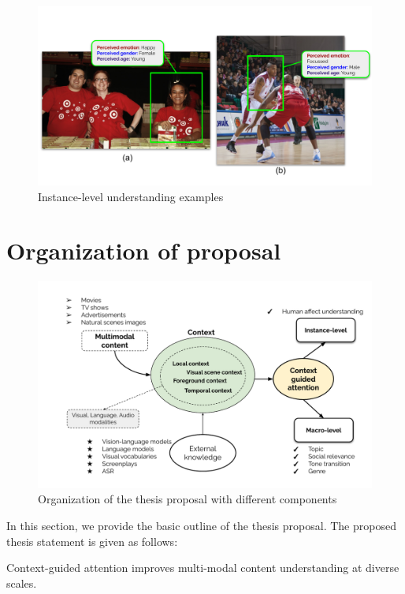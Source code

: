 \begin{figure}
 \centering
    \includegraphics[width=\textwidth]{figures/instance_level_scale_understanding.pdf}
    \caption{Instance-level understanding examples}
    \label{instance_scale_understanding}
\end{figure}


\section{Organization of proposal}

\begin{figure}[h!]
    \centering
        \includegraphics[width=\textwidth]{figures/Overview_diagram.pdf}
        \caption{Organization of the thesis proposal with different components}
        \label{proposalorganization}
\end{figure}

In this section, we provide the basic outline of the thesis proposal. The proposed thesis statement is given as follows:

\begin{tcolorbox}[width=\textwidth]
Context-guided attention improves multi-modal content understanding at diverse scales.
\end{tcolorbox}


